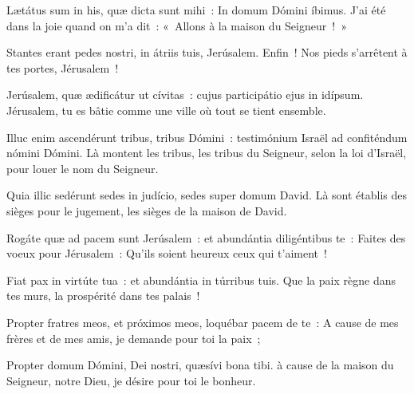 \begin{paracol}{2}

\LigneParacol{0cm}
{Lætátus sum in his, quæ dicta sunt mihi~: \GreStar{} In domum Dómini íbimus.}
{J'ai été dans la joie quand on m'a dit~: «~Allons à la maison du Seigneur~!~»}

\LigneParacol{0.2cm}
{Stantes erant pedes nostri, \GreStar{} in átriis tuis, Jerúsalem.}
{Enfin~! Nos pieds s'arrêtent à tes portes, Jérusalem~!}

\LigneParacol{0.2cm}
{Jerúsalem, quæ ædificátur ut cívitas~: \GreStar{} cujus participátio ejus in idípsum.}
{Jérusalem, tu es bâtie comme une ville où tout se tient ensemble.}

\LigneParacol{0.2cm}
{Illuc enim ascendérunt tribus, tribus Dómini~: \GreStar{} testimónium Israël ad confiténdum nómini Dómini.}
{Là montent les tribus, les tribus du Seigneur, selon la loi d'Israël, pour louer le nom du Seigneur.}

\LigneParacol{0.2cm}
{Quia illic sedérunt sedes in judício, \GreStar{} sedes super domum David.}
{Là sont établis des sièges pour le jugement, les sièges de la maison de David.}

\LigneParacol{0.2cm}
{Rogáte quæ ad pacem sunt Jerúsalem~: \GreStar{} et abundántia diligéntibus te~:}
{Faites des voeux pour Jérusalem~: Qu'ils soient heureux ceux qui t'aiment~!}

\LigneParacol{0.2cm}
{Fiat pax in virtúte tua~: \GreStar{} et abundántia in túrribus tuis.}
{Que la paix règne dans tes murs, la prospérité dans tes palais~!}

\LigneParacol{0.2cm}
{Propter fratres meos, et próximos meos, \GreStar{} loquébar pacem de te~:}
{A cause de mes frères et de mes amis, je demande pour toi la paix~;}

\LigneParacol{0.2cm}
{Propter domum Dómini, Dei nostri, \GreStar{} quæsívi bona tibi.}
{à cause de la maison du Seigneur, notre Dieu, je désire pour toi le bonheur. }

\end{paracol}
